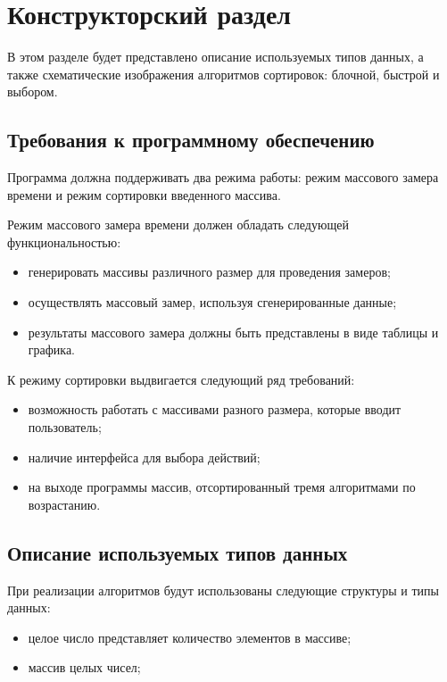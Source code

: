 \chapter{Конструкторский раздел}

В этом разделе будет представлено описание используемых типов данных, а также схематические изображения алгоритмов сортировок: блочной, быстрой и выбором.

\section{Требования к программному обеспечению}

Программа должна поддерживать два режима работы: режим массового замера времени и режим сортировки введенного массива.

Режим массового замера времени должен обладать следующей функциональностью:
\begin{itemize}
	\item генерировать массивы различного размер для проведения замеров;
	\item осуществлять массовый замер, используя сгенерированные данные;
	\item результаты массового замера должны быть представлены в виде таблицы и графика.
\end{itemize}

К режиму сортировки выдвигается следующий ряд требований:
\begin{itemize}
	\item возможность работать с массивами разного размера, которые вводит пользователь;
	\item наличие интерфейса для выбора действий;
	\item на выходе программы массив, отсортированный тремя алгоритмами по возрастанию.
\end{itemize}

\section{Описание используемых типов данных}

При реализации алгоритмов будут использованы следующие структуры и типы данных:
\begin{itemize}
	\item целое число представляет количество элементов в массиве;
	\item массив целых чисел;
\end{itemize}

